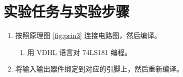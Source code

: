 \section{实验任务与实验步骤}

\begin{enumerate}
    \item 按照原理图 \ref{fig:prin3} 连接电路图，然后编译。
    
    \begin{enumerate}
        \item 用 VDHL 语言对 74LS181 编程。
        
        
    \end{enumerate}
    
    \item 将输入输出器件绑定到对应的引脚上，然后重新编译。
    

\end{enumerate}
